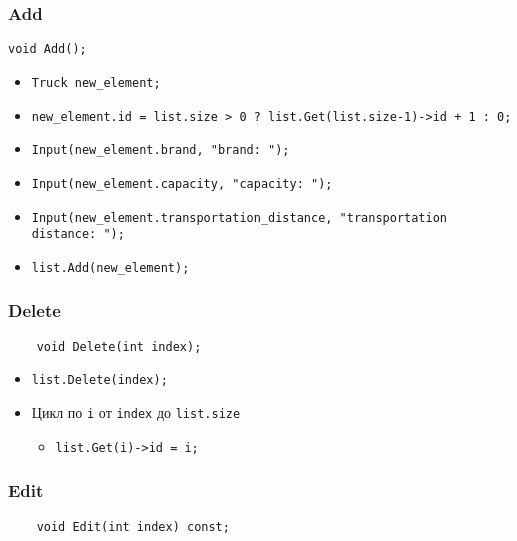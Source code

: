 \subsubsection*{Add}

\begin{lstlisting}
void Add();
\end{lstlisting}

\begin{itemize}
	\item \verb|Truck new_element;|
	\item \verb|new_element.id = list.size > 0 ? list.Get(list.size-1)->id + 1 : 0;|
	\item \verb|Input(new_element.brand, "brand: ");|
	\item \verb|Input(new_element.capacity, "capacity: ");|
	\item \verb|Input(new_element.transportation_distance, "transportation distance: ");|
	\item \verb|list.Add(new_element);|
\end{itemize}


\subsubsection*{Delete}

\begin{lstlisting}
    void Delete(int index);
\end{lstlisting}

\begin{itemize}
	\item \verb|list.Delete(index);|
    \item Цикл по \verb|i| от \verb|index| до \verb|list.size| 
    \begin{itemize}
        \item \verb|list.Get(i)->id = i;|
    \end{itemize}
\end{itemize}



\subsubsection*{Edit}

\begin{lstlisting}
    void Edit(int index) const;
\end{lstlisting}

